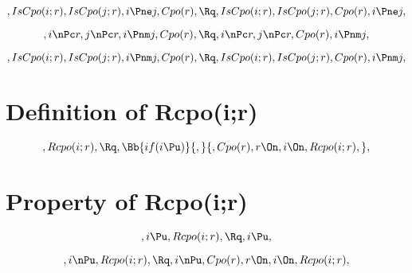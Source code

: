 \[, IsCpo(i;r), IsCpo(j;r), i \Pne j, Cpo(r), \Rq , IsCpo(i;r), IsCpo(j;r), Cpo(r), i \Pne j, \]

\[, i \nPc r, j \nPc r, i \Pnm j, Cpo(r), \Rq , i \nPc r, j \nPc r, Cpo(r), i \Pnm j, \]

\[, IsCpo(i;r), IsCpo(j;r), i \Pnm j, Cpo(r), \Rq , IsCpo(i;r), IsCpo(j;r), Cpo(r), i \Pnm j, \]

\bigskip
\bigskip
\section{Definition of Rcpo(i;r)}
\[,Rcpo(i;r), \Rq , \Bb{if(i \Pu)}{,}{, Cpo(r), r \On, i \On, Rcpo(i;r),}, \]



\bigskip
\bigskip
\section{Property of Rcpo(i;r)}
\[, i \Pu, Rcpo(i;r), \Rq , i \Pu, \]

\[, i \nPu, Rcpo(i;r), \Rq , i \nPu, Cpo(r), r \On, i \On, Rcpo(i;r), \]


